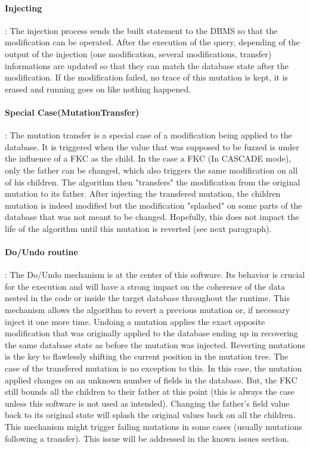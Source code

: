 \documentclass{article}
\begin{document}
\begin{empfile}
				\paragraph{Injecting} :
The injection process sends the built statement to the DBMS so that the modification can be operated. After the execution of the query, depending of the output of the injection (one modification, several modifications, transfer) informations are updated so that they can match the database state after the modification. If the modification failed, no trace of this mutation is kept, it is erased and running goes on like nothing happened.  				
				\paragraph{Special Case(MutationTransfer)} :
The mutation transfer is a special case of a modification being applied to the database.
It is triggered when the value that was supposed to be fuzzed is under the influence of a FKC as the child.
In the case a FKC (In CASCADE mode), only the father can be changed, which also triggers the same modification on all of his children. The algorithm then "transfers" the modification from the original mutation to its father.
After injecting the transfered mutation, the children mutation is indeed modified but the modification "splashed" on some parts of the database that was not meant to be changed.
Hopefully, this does not impact the life of the algorithm until this mutation is reverted (see next paragraph).
				\paragraph{Do/Undo routine} :
The Do/Undo mechanism is at the center of this software. Its behavior is crucial for the execution and will have a strong impact on the coherence of the data nested in the code or inside the target database throughout the runtime.
This mechanism allows the algorithm to revert a previous mutation or, if necessary inject it one more time. 
Undoing a mutation applies the exact opposite modification that was originally applied to the database ending up in recovering the same database state as before the mutation was injected.
Reverting mutations is the key to flawlessly shifting the current position in the mutation tree.
The case of the transfered mutation is no exception to this. In this case, the mutation applied changes on an unknown number of fields in the database. But, the FKC still bounds all the children to their father at this point (this is always the case unless this software is not used as intended).  
Changing the father's field value back to its original state will splash the original values back on all the children.
This mechanism might trigger failing mutations in some cases (usually mutations following a transfer). This issue will be addressed in the known issues section. 

\end{empfile}
\end{document}

